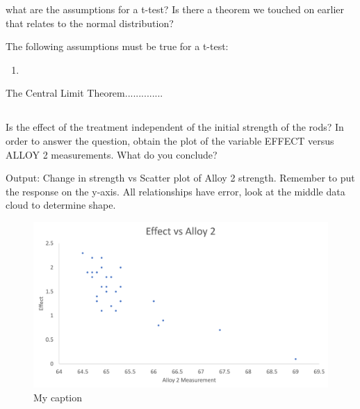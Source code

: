 \documentclass[letterpaper]{article}
\begin{document}
what are the assumptions for a t-test? Is there a theorem we touched on earlier
that relates to the normal distribution?

The following assumptions must be true for a t-test:
\begin{enumerate}
 \item
\end{enumerate}
The Central Limit Theorem..............

\subsection{}%
Is the effect of the treatment independent of the initial strength of the rods?
In order to answer the  question, obtain the plot of the variable EFFECT versus
ALLOY 2 measurements. What do you  conclude?

Output: Change in strength vs Scatter plot of Alloy 2 strength.
Remember to put the response on the y-axis. All relationships have
error, look at the middle data cloud to determine shape.

\begin{figure}[H]
 \centering
 \includegraphics[width=\textwidth]{q6.png}
 \caption{My caption}
 \label{q6}
\end{figure}
\end{document}
